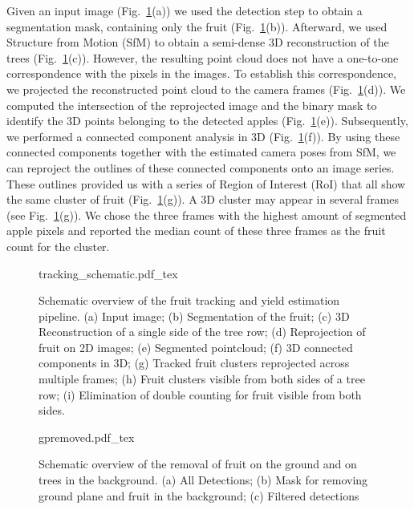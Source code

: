 Given an input image (Fig.~\ref{fig:trackpipeline}(a)) we used the detection step to obtain a segmentation mask, containing only the fruit (Fig.~\ref{fig:trackpipeline}(b)). Afterward, we used Structure from Motion (SfM) to obtain a semi-dense 3D reconstruction of the trees (Fig.~\ref{fig:trackpipeline}(c)). However, the resulting point cloud does not have a one-to-one correspondence with the pixels in the images. To establish this correspondence, we projected the reconstructed point cloud to the camera frames (Fig.~\ref{fig:trackpipeline}(d)). We computed the intersection of the reprojected image and the binary mask to identify the 3D points belonging to the detected apples (Fig.~\ref{fig:trackpipeline}(e)). Subsequently, we performed a connected component analysis in 3D (Fig.~\ref{fig:trackpipeline}(f)). By using these connected components together with the estimated camera poses from SfM, we can reproject the outlines of these connected components onto an image series. These outlines provided us with a series of Region of Interest (RoI) that all show the same cluster of fruit (Fig.~\ref{fig:trackpipeline}(g)). A 3D cluster may appear in several frames (see Fig.~\ref{fig:trackpipeline}(g)). We chose the three frames with the highest amount of segmented apple pixels and reported the median count of these three frames as the fruit count for the cluster. 

\begin{figure}[!hbpt]
    \centering
    \def\svgwidth{\textwidth}
    {tracking_schematic.pdf_tex}\label{fig:track}
    \caption[Schematic overview of the fruit tracking and yield estimation pipeline.]{Schematic overview of the fruit tracking and yield estimation pipeline. (a) Input image; (b) Segmentation of the fruit; (c) 3D Reconstruction of a single side of the tree row; (d) Reprojection of fruit on 2D images; (e) Segmented pointcloud; (f) 3D connected components in 3D; (g) Tracked fruit clusters reprojected across multiple frames; (h) Fruit clusters visible from both sides of a tree row; (i) Elimination of double counting for fruit visible from both sides.}
    \label{fig:trackpipeline}
\end{figure}



\begin{figure}[!hbpt]
    \centering
    \def\svgwidth{\textwidth}
    {gpremoved.pdf_tex}\label{fig:gpremoved}
    \caption[Schematic overview of the removal of fruit on the ground and on trees in the background.]{Schematic overview of the removal of fruit on the ground and on trees in the background. (a) All Detections; (b) Mask for removing ground plane and fruit in the background; (c) Filtered detections}
    \label{fig:gp_removed}
\end{figure}

